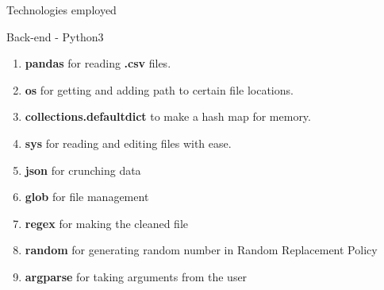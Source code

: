 \documentclass{article}
\begin{document}
\newpage
\begin{centering}
\begin{Huge}
\begin{bf}
\vspace{2.0cm}
\textsf{Technologies employed}\\
\end{bf}
\end{Huge}
\end{centering}
\protect\vspace{2.0cm}
\textbf{}
\huge
Back-end - Python3
\begin{enumerate}
  \item {\bf pandas} for reading {\bf .csv} files.
  \item {\bf os} for getting and adding path to certain file locations.
  \item {\bf collections.defaultdict} to make a hash map for memory.
  \item {\bf sys} for reading and editing files with ease.
  \item {\bf json} for crunching data
  \item {\bf glob} for file management
  \item {\bf regex} for making the cleaned file
  \item {\bf random} for generating random number in Random Replacement Policy
  \item {\bf argparse} for taking arguments from the user
\end{enumerate}\\
\textbf{}
\end{document}
